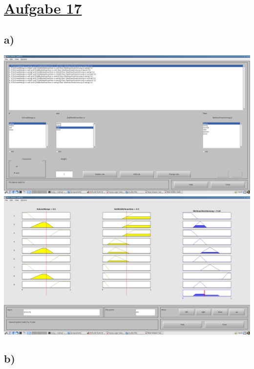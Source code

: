 \section*{\underline{Aufgabe 17}}

\subsection*{a)}

\includegraphics[width=\textwidth]{part/screenshots/fuzzy-17a-1}
\includegraphics[width=\textwidth]{part/screenshots/fuzzy-17a-2}

\subsection*{b)}

